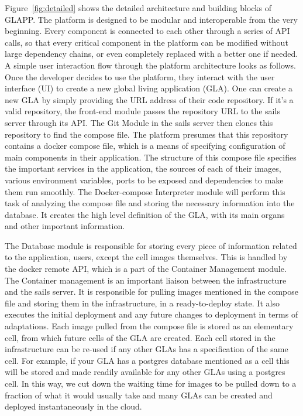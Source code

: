\documentclass{seal_thesis}
\begin{document}
Figure~\ref{fig:detailed} shows the detailed architecture and building blocks of GLAPP.
The platform is designed to be modular and interoperable from the very beginning. 
Every component is connected to each other through a series of API calls, so that every critical component in the platform can be modified without large dependency chains, or even completely replaced with a better one if needed.
A simple user interaction flow through the platform architecture looks as follows. 
Once the developer decides to use the platform, they interact with the user interface (UI) to create a new global living application (GLA). 
One can create a new GLA by simply providing the URL address of their code repository. 
If it's a valid repository, the front-end module passes the repository URL to the sails server through its API. 
The Git Module in the sails server then clones this repository to find the compose file. 
The platform presumes that this repository contains a docker compose file, which is a means of specifying configuration of main components in their application. 
The structure of this compose file specifies the important services in the application, the sources of each of their images, various environment variables, ports to be exposed and dependencies to make them run smoothly. 
The Docker-compose Interpreter module will perform this task of analyzing the compose file and storing the necessary information into the database. 
It creates the high level definition of the GLA, with its main organs and other important information.

The Database module is responsible for storing every piece of information related to the application, users, except the cell images themselves. 
This is handled by the docker remote API, which is a part of the Container Management module.
The Container management is an important liaison between the infrastructure and the sails server. 
It is responsible for pulling images mentioned in the compose file and storing them in the infrastructure, in a ready-to-deploy state. 
It also executes the initial deployment and any future changes to deployment in terms of adaptations. 
Each image pulled from the compose file is stored as an elementary cell, from which future cells of the GLA are created. 
Each cell stored in the infrastructure can be re-used if any other GLAs has a specification of the same cell. 
For example, if your GLA has a postgres database mentioned as a cell this will be stored and made readily available for any other GLAs using a postgres cell. 
In this way, we cut down the waiting time for images to be pulled down to a fraction of what it would usually take and many GLAs can be created and deployed instantaneously in the cloud.
\end{document}
